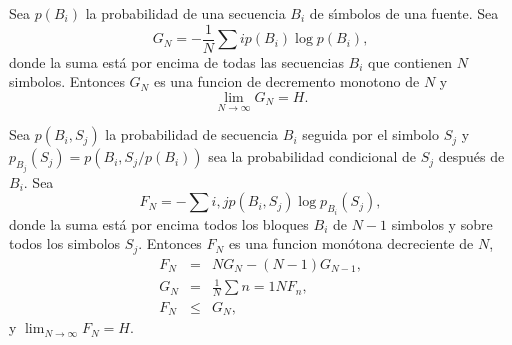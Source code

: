 \begin{theorem}
\label{th:5}
Sea $p(B_{i})$ la probabilidad de una secuencia $B_{i}$ de
s\'{\i}mbolos de una fuente. Sea
\begin{equation}
G_{N} = - \frac{1}{N} \sum{i}{} p(B_{i}) \log p(B_{i}),
\end{equation}
donde la suma est\'{a} por encima de todas las secuencias $B_{i}$ que
contienen $N$ simbolos. Entonces $G_{N}$ es una funcion de decremento
monotono de $N$ y
\begin{equation}
\lim_{N \rightarrow \infty} G_{N} = H.
\end{equation}
\end{theorem}

\begin{theorem}
\label{th:6}
Sea $p(B_{i},S_{j})$ la probabilidad de secuencia $B_{i}$ seguida por
el simbolo $S_{j}$ y $p_{B_{j}}(S_{j}) = p(B_{i},S_{j}/p(B_{i}))$ sea
la probabilidad condicional de $S_{j}$ despu\'{e}s de $B_{i}$. Sea
\begin{equation}
F_{N} = - \sum{i,j}{} p(B_{i},S_{j}) \log p_{B_{i}}(S_{j}),
\end{equation}
donde la suma est\'{a} por encima todos los bloques $B_{i}$ de $N-1$
simbolos y sobre todos los simbolos $S_{j}$. Entonces $F_{N}$ es una
funcion mon\'{o}tona decreciente de $N$,
\begin{equation}
\begin{array}{rcl}
F_{N} &=& NG_{N} - (N - 1)G_{N-1}, \\
G_{N} &=& \frac{1}{N} \sum{n=1}{N} F_{n}, \\
F_{N} &\leq& G_{N},
\end{array}
\end{equation}
y $\lim_{N \rightarrow \infty} F_{N} = H$.  
\end{theorem}

